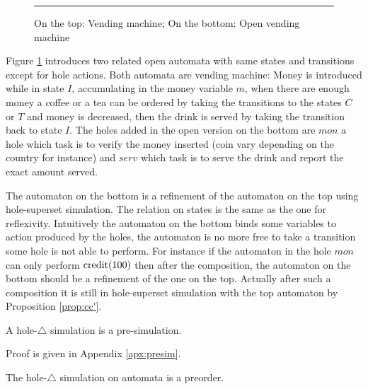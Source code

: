 \documentclass{article}
\begin{document}
\begin{exi}
\begin{figure}
\centering

\vspace{3pt}
\hrule
\vspace{3pt}

\caption{On the top: Vending machine; On the bottom: Open vending machine}
\label{fig:ovm}
\end{figure}
Figure \ref{fig:ovm} introduces two related open automata with same states and transitions except for hole actions.
Both automata are vending machine: Money is introduced while in state \(I\), accumulating in the money variable \(m\), when there are enough money a coffee or a tea can be ordered by taking the transitions to the states \(C\) or \(T\) and money is decreased, then the drink is served by taking the transition back to state \(I\).
The holes added in the open version on the bottom are \(mon\) a hole which task is to verify the money inserted (coin vary depending on the country for instance) and \(serv\) which task is to serve the drink and report the exact amount served.

The automaton on the bottom is a refinement of the automaton on the top using hole-superset simulation.
The relation on states is the same as the one for reflexivity.
Intuitively the automaton on the bottom binds some variables to action produced by the holes, the automaton is no more free to take a transition some hole is not able to perform.
For instance if the automaton in the hole \(mon\) can only perform \(\mathrm{credit}{\left(100\right)}\) then after the composition, the automaton on the bottom should be a refinement of the one on the top.
Actually after such a composition it is still in hole-superset simulation with the top automaton by Proposition \ref{prop:cc'}.
\end{exi}
\begin{thm} A hole-\(\triangle\) simulation is a pre-simulation. \end{thm}
Proof is given in Appendix \ref{apx:presim}.
\begin{thm} The hole-\(\triangle\) simulation on automata is a preorder. \end{thm}
\end{document}
